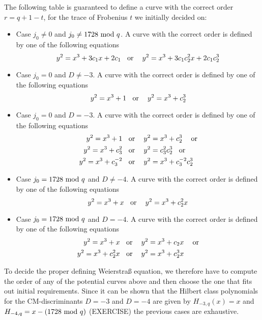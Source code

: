 The following table is guaranteed to define a curve with the correct order $r= q+1 -t$, for the trace of Frobenius $t$ we initially decided on:
\begin{itemize}
\item Case $j_0 \neq 0 $ and $j_0\neq 1728 \text{ mod } q$. A curve with the correct order is defined by one of the following equations 
\begin{equation}
y^2 = x^3 + 3c_1x + 2c_1 \text{\;\; or \;\; } y^2 = x^3 + 3c_1c_2^2x + 2c_1c_2^3
\end{equation}
\item Case $j_0 = 0 $ and $D\neq -3$. A curve with the correct order is defined by one of the following equations 
\begin{equation}
y^2 = x^3 + 1 \text{\;\; or \;\; } y^2 = x^3 + c_2^3
\end{equation}
\item Case $j_0 = 0 $ and $D= -3$. A curve with the correct order is defined by one of the following equations 
\begin{align*}
y^2 = x^3 +1 & \text{\;\; or \;\; } y^2 = x^3 + c_2^3 \text{ \;\; or}\\  
y^2 = x^3 + c_3^2 & \text{\;\; or \;\; } y^2 = c_3^2 c_2^3 \text{\;\; or}\\
y^2 = x^3 + c_3^{-2} & \text{\;\; or \;\; }  y^2 = x^3 + c_3^{-2}c_2^3 
\end{align*}
\item Case $j_0 = 1728 \text{ mod } q $ and $D\neq -4$. A curve with the correct order is defined by one of the following equations 
\begin{equation}
y^2 = x^3 + x \text{\;\; or \;\; } y^2 = x^3 + c_2^2x
\end{equation}
\item Case $j_0 = 1728 \text{ mod } q $ and $D= -4$. A curve with the correct order is defined by one of the following equations 
\begin{align*}
y^2 = x^3 +x & \text{\;\; or \;\; } y^2 = x^3 + c_2x \text{ \;\; or}\\  
y^2 = x^3 + c_2^2x & \text{\;\; or \;\; } y^2 = x^3 + c_2^3x
\end{align*}
\end{itemize} 
To decide the proper defining Weierstraß equation, we therefore have to compute the order of any of the potential curves above and then choose the one that fits out initial requirements. Since it can be shown that the Hilbert class polynomials for the CM-discriminants $D=-3$ and $D=-4$ are given by  $H_{-3,q}(x)=x$ and $H_{-4,q}= x-(1728 \text{ mod } q)$ (EXERCISE) the previous cases are exhaustive.


